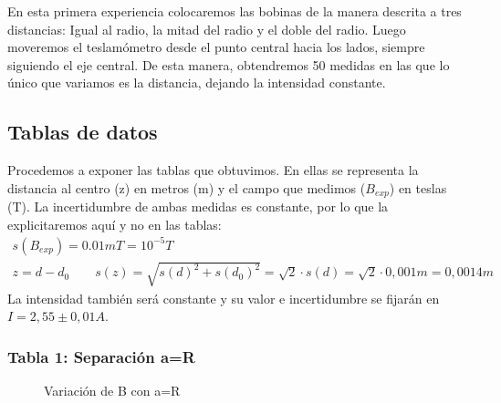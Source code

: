 \documentclass[12pt, a4paper, titlepage]{article}
\begin{document}
  En esta primera experiencia colocaremos las bobinas de la manera descrita a tres distancias: Igual al radio, la mitad del radio y el doble del radio. Luego moveremos el teslamómetro desde el punto central hacia los lados, siempre siguiendo el eje central. De esta manera, obtendremos 50 medidas en las que lo único que variamos es la distancia, dejando la intensidad constante.

  \subsection{Tablas de datos}

  Procedemos a exponer las tablas que obtuvimos. En ellas se representa la distancia al centro (z) en metros (m) y el campo que medimos ($B_{exp}$) en teslas (T). La incertidumbre de ambas medidas es constante, por lo que la explicitaremos aquí y no en las tablas:
  \begin{gather}
    s(B_{exp}) = 0.01mT = 10^{-5}T \nonumber \\
    z = d - d_0 \qquad s(z) = \sqrt{s(d)^2 + s(d_0)^2} = \sqrt{2} \cdot s(d) = \sqrt{2} \cdot 0,001m = 0,0014m \nonumber
  \end{gather}
  La intensidad también será constante y su valor e incertidumbre se fijarán en $I = 2,55 \pm 0,01 A$.

  \subsubsection{Tabla 1: Separación a=R}

  \begin{figure}[H]
    \begin{table}[H]
      \centering
       \quad
    \end{table}
    \caption{Variación de B con a=R}
  \end{figure}
\end{document}
